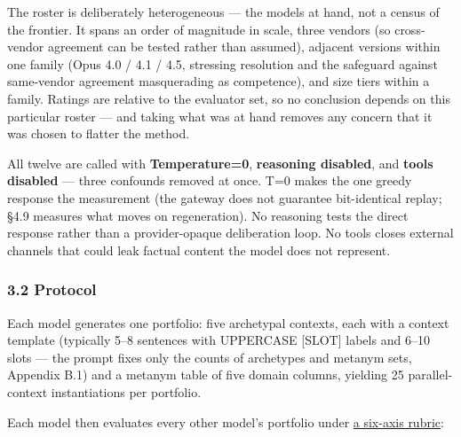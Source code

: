 The roster is deliberately heterogeneous --- the models at hand, not a census of the frontier. It spans an order of magnitude in scale, three vendors (so cross-vendor agreement can be tested rather than assumed), adjacent versions within one family (Opus 4.0 / 4.1 / 4.5, stressing resolution and the safeguard against same-vendor agreement masquerading as competence), and size tiers within a family. Ratings are relative to the evaluator set, so no conclusion depends on this particular roster --- and taking what was at hand removes any concern that it was chosen to flatter the method.

All twelve are called with \textbf{Temperature=0}, \textbf{reasoning disabled}, and \textbf{tools disabled} --- three confounds removed at once. T=0 makes the one greedy response the measurement (the gateway does not guarantee bit-identical replay; §4.9 measures what moves on regeneration). No reasoning tests the direct response rather than a provider-opaque deliberation loop. No tools closes external channels that could leak factual content the model does not represent.

\subsubsection{3.2 Protocol}\label{protocol}

Each model generates one portfolio: five archetypal contexts, each with a context template (typically 5--8 sentences with UPPERCASE {[}SLOT{]} labels and 6--10 slots --- the prompt fixes only the counts of archetypes and metanym sets, Appendix B.1) and a metanym table of five domain columns, yielding 25 parallel-context instantiations per portfolio.

Each model then evaluates every other model's portfolio under \hyperref[tab-rubric]{a six-axis rubric}:

\protect{}\label{tab-rubric}{}

